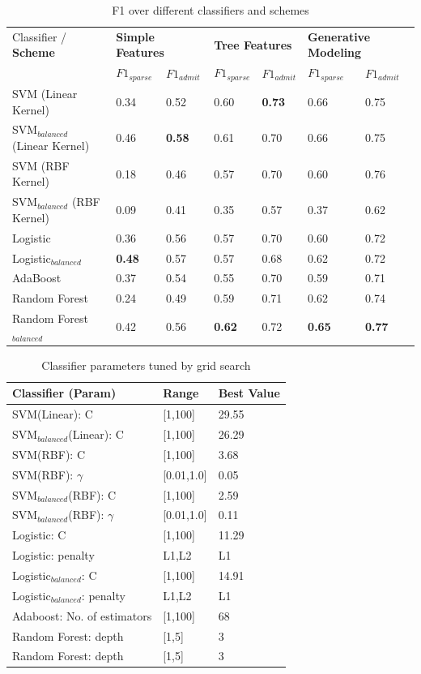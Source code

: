 \documentclass{sig-alternate-05-2015}
\begin{document}
\begin{table}[t]
\centering
\caption{F1 over different classifiers and schemes}
\label{tab:all-f1}
\begin{tabular}{|l|l l|l l|l l|}
\hline
Classifier / \textbf{Scheme} & \multicolumn{2}{l|}{\textbf{Simple Features}} & \multicolumn{2}{l|}{\textbf{Tree Features}} & \multicolumn{2}{l|}{\textbf{Generative Modeling}} \\
 & $F1_{sparse}$ & $F1_{admit}$ & $F1_{sparse}$ & $F1_{admit}$ & $F1_{sparse}$ & $F1_{admit}$ \\ \hline
SVM (Linear Kernel) 				& 0.34 & 0.52 & 0.60 & \textbf{0.73} & 0.66 & 0.75 \\ \hline
SVM$_{balanced}$ (Linear Kernel)	& 0.46 & \textbf{0.58} & 0.61 & 0.70 & 0.66 & 0.75 \\ \hline
SVM (RBF Kernel) 					& 0.18 & 0.46 & 0.57 & 0.70 & 0.60 & 0.76 \\ \hline
SVM$_{balanced}$ (RBF Kernel) 		& 0.09 & 0.41 & 0.35 & 0.57 & 0.37 & 0.62 \\ \hline
Logistic 							& 0.36 & 0.56 & 0.57 & 0.70 & 0.60 & 0.72 \\ \hline
Logistic$_{balanced}$ 				& \textbf{0.48} & 0.57 & 0.57 & 0.68 & 0.62 & 0.72 \\ \hline
AdaBoost 							& 0.37 & 0.54 & 0.55 & 0.70 & 0.59 & 0.71 \\ \hline
Random Forest 						& 0.24 & 0.49 & 0.59 & 0.71 & 0.62 & 0.74 \\ \hline
Random Forest$_{balanced}$ 			& 0.42 & 0.56 & \textbf{0.62} & 0.72 & \textbf{0.65} & \textbf{0.77} \\ \hline
\end{tabular}
\end{table}

\begin{table}[t]
\centering
\caption{Classifier parameters tuned by grid search}
\label{tab:params}
\begin{tabular}{l l l}
\hline
Classifier (Param) & Range & Best Value \\ \hline
SVM(Linear): C & [1,100] & 29.55 \\
SVM$_{balanced}$(Linear): C & [1,100] & 26.29 \\ \hline
SVM(RBF): C & [1,100] & 3.68 \\
SVM(RBF): $\gamma$ & [0.01,1.0] & 0.05 \\
SVM$_{balanced}$(RBF): C & [1,100] & 2.59 \\
SVM$_{balanced}$(RBF): $\gamma$ & [0.01,1.0] & 0.11 \\ \hline
Logistic: C & [1,100] & 11.29 \\
Logistic: penalty & {L1,L2} & L1 \\
Logistic$_{balanced}$: C & [1,100] & 14.91 \\
Logistic$_{balanced}$: penalty & {L1,L2} & L1 \\ \hline
Adaboost: No. of estimators & [1,100] & 68 \\ \hline
Random Forest: depth & [1,5] & 3 \\
Random Forest: depth & [1,5] & 3 \\ \hline 
\end{tabular}
\end{table}
\end{document}
